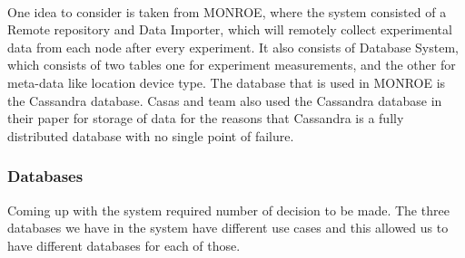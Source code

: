 \paragraph{}
One idea to consider is taken from MONROE\cite{7523537}, where the system consisted of a Remote repository and Data Importer, which will remotely collect experimental data from each node after every experiment.
It also consists of Database System, which consists of two tables one for experiment measurements, and the other for meta-data like location device type.
The database that is used in MONROE is the Cassandra database.
Casas and team also used the Cassandra database in their paper for storage of data for the reasons that Cassandra is a fully distributed database with no single point of failure\cite{8255998}.
\subsubsection{Databases}
Coming up with the system required number of decision to be made.
The three databases we have in the system have different use cases and this allowed us to have different databases for each of those.
